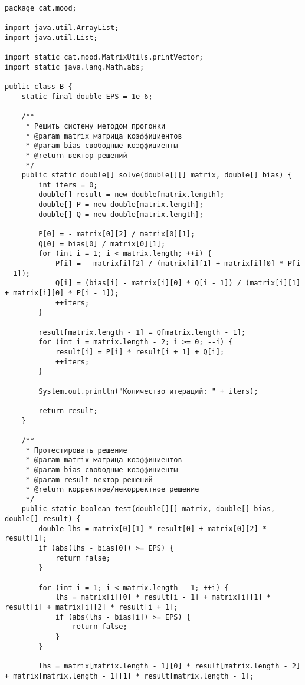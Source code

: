 \begin{verbatim}
package cat.mood;

import java.util.ArrayList;
import java.util.List;

import static cat.mood.MatrixUtils.printVector;
import static java.lang.Math.abs;

public class B {
    static final double EPS = 1e-6;

    /**
     * Решить систему методом прогонки
     * @param matrix матрица коэффициентов
     * @param bias свободные коэффициенты
     * @return вектор решений
     */
    public static double[] solve(double[][] matrix, double[] bias) {
        int iters = 0;
        double[] result = new double[matrix.length];
        double[] P = new double[matrix.length];
        double[] Q = new double[matrix.length];

        P[0] = - matrix[0][2] / matrix[0][1];
        Q[0] = bias[0] / matrix[0][1];
        for (int i = 1; i < matrix.length; ++i) {
            P[i] = - matrix[i][2] / (matrix[i][1] + matrix[i][0] * P[i - 1]);
            Q[i] = (bias[i] - matrix[i][0] * Q[i - 1]) / (matrix[i][1] + matrix[i][0] * P[i - 1]);
            ++iters;
        }

        result[matrix.length - 1] = Q[matrix.length - 1];
        for (int i = matrix.length - 2; i >= 0; --i) {
            result[i] = P[i] * result[i + 1] + Q[i];
            ++iters;
        }

        System.out.println("Количество итераций: " + iters);

        return result;
    }

    /**
     * Протестировать решение
     * @param matrix матрица коэффициентов
     * @param bias свободные коэффициенты
     * @param result вектор решений
     * @return корректное/некорректное решение
     */
    public static boolean test(double[][] matrix, double[] bias, double[] result) {
        double lhs = matrix[0][1] * result[0] + matrix[0][2] * result[1];
        if (abs(lhs - bias[0]) >= EPS) {
            return false;
        }

        for (int i = 1; i < matrix.length - 1; ++i) {
            lhs = matrix[i][0] * result[i - 1] + matrix[i][1] * result[i] + matrix[i][2] * result[i + 1];
            if (abs(lhs - bias[i]) >= EPS) {
                return false;
            }
        }

        lhs = matrix[matrix.length - 1][0] * result[matrix.length - 2] + matrix[matrix.length - 1][1] * result[matrix.length - 1];


\end{verbatim}
